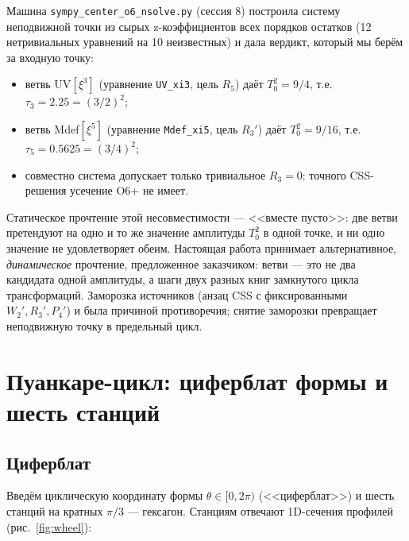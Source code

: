 \documentclass[11pt,a4paper]{article}
\newcommand{\tauu}{\tau_{3}}
\newcommand{\tauf}{\tau_{5}}
\begin{document}
Машина \texttt{sympy\_center\_o6\_nsolve.py} (сессия 8) построила систему
неподвижной точки из сырых z-коэффициентов всех порядков остатков
(12 нетривиальных уравнений на 10 неизвестных) и дала вердикт, который мы
берём за входную точку:
\begin{itemize}
\item ветвь UV$[\xi^3]$ (уравнение \texttt{UV\_xi3}, цель $R_5$) даёт
  $T_0^2 = 9/4$, т.е. $\tauu = 2.25 = (3/2)^2$;
\item ветвь Mdef$[\xi^5]$ (уравнение \texttt{Mdef\_xi5}, цель $R_3'$) даёт
  $T_0^2 = 9/16$, т.е. $\tauf = 0.5625 = (3/4)^2$;
\item совместно система допускает только тривиальное $R_3 = 0$: точного
  CSS-решения усечение O6+ не имеет.
\end{itemize}
Статическое прочтение этой несовместимости --- <<вместе пусто>>: две ветви
претендуют на одно и то же значение амплитуды $T_0^2$ в одной точке, и ни одно
значение не удовлетворяет обеим. Настоящая работа принимает альтернативное,
\emph{динамическое} прочтение, предложенное заказчиком: ветви --- это не два
кандидата одной амплитуды, а шаги двух разных книг замкнутого цикла
трансформаций. Заморозка источников (анзац CSS с фиксированными $W_2', R_3',
P_4'$) и была причиной противоречия; снятие заморозки превращает
неподвижную точку в предельный цикл.

\section{Пуанкаре-цикл: циферблат формы и шесть станций}

\subsection{Циферблат}

Введём циклическую координату формы $\theta \in [0, 2\pi)$ (<<циферблат>>) и
шесть станций на кратных $\pi/3$ --- гексагон. Станциям отвечают 1D-сечения
профилей (рис.~\ref{fig:wheel}):
\end{document}

